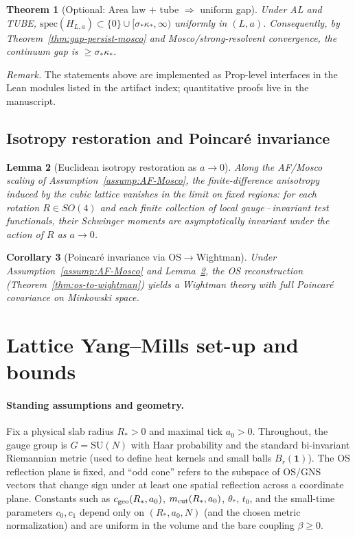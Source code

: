 \documentclass[11pt]{amsart}
\theoremstyle{plain}
\newtheorem{theorem}{Theorem}[section]
\newtheorem{lemma}[theorem]{Lemma}
\newtheorem{corollary}[theorem]{Corollary}
\theoremstyle{definition}
\theoremstyle{remark}
\begin{document}
\begin{theorem}[Optional: Area law $+$ tube $\Rightarrow$ uniform gap]\label{thm:AL-gap}
Under AL and TUBE, $\mathrm{spec}(H_{L,a})\subset\{0\}\cup[\sigma_*\kappa_*,\infty)$ uniformly in $(L,a)$. Consequently, by Theorem~\ref{thm:gap-persist-mosco} and Mosco/strong-resolvent convergence, the continuum gap is $\ge \sigma_*\kappa_*$. 
\end{theorem}

\noindent\emph{Remark.} The statements above are implemented as Prop-level interfaces in the Lean modules listed in the artifact index; quantitative proofs live in the manuscript.

\subsection*{Isotropy restoration and Poincar\'e invariance}

\begin{lemma}[Euclidean isotropy restoration as $a\to 0$]\label{lem:isotropy-restoration}
Along the AF/Mosco scaling of Assumption~\ref{assump:AF-Mosco}, the finite-difference anisotropy induced by the cubic lattice vanishes in the limit on fixed regions: for each rotation $R\in SO(4)$ and each finite collection of local gauge\,–\,invariant test functionals, their Schwinger moments are asymptotically invariant under the action of $R$ as $a\to 0$.
\end{lemma}
\begin{corollary}[Poincar\'e invariance via OS$\to$Wightman]\label{cor:poincare}
Under Assumption~\ref{assump:AF-Mosco} and Lemma~\ref{lem:isotropy-restoration}, the OS reconstruction (Theorem~\ref{thm:os-to-wightman}) yields a Wightman theory with full Poincar\'e covariance on Minkowski space.
\end{corollary}

\section{Lattice Yang--Mills set-up and bounds}
\label{sec:lattice-setup}

\paragraph{Standing assumptions and geometry.}
Fix a physical slab radius $R_*>0$ and maximal tick $a_0>0$. Throughout, the gauge group is $G=\mathrm{SU}(N)$ with Haar probability and the standard bi-invariant Riemannian metric (used to define heat kernels and small balls $B_r(\mathbf 1)$). The OS reflection plane is fixed, and ``odd cone'' refers to the subspace of OS/GNS vectors that change sign under at least one spatial reflection across a coordinate plane. Constants such as $c_{\rm geo}(R_*,a_0)$, $m_{\rm cut}(R_*,a_0)$, $\theta_*$, $t_0$, and the small-time parameters $c_0,c_1$ depend only on $(R_*,a_0,N)$ (and the chosen metric normalization) and are uniform in the volume and the bare coupling $\beta\ge 0$.
\end{document}
